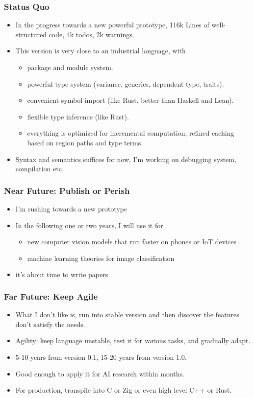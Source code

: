 \documentclass{beamer}   	%
\theoremstyle{definition}
\begin{document}
\begin{frame}
\frametitle{Status Quo}
\begin{itemize}
	\item In the progress towards a new powerful prototype, 116k Lines of well-structured code, 4k todos, 2k warnings.
	\item This version is very close to an industrial language, with
	\begin{itemize}
		\item package and module system.
		\item powerful type system (variance, generics, dependent type, traits).
		\item convenient symbol import (like Rust, better than Haskell and Lean).
		\item flexible type inference (like Rust).
		\item everything is optimized for incremental computation, refined caching based on region paths and type terms.
	\end{itemize}
	\item Syntax and semantics suffices for now, I'm working on debugging system, compilation etc.
\end{itemize}
\end{frame}

\begin{frame}
\frametitle{Near Future: Publish or Perish}
\begin{itemize}
	\item I'm rushing towards a new prototype
	\item In the following one or two years, I will use it for 
	\begin{itemize}
		\item new computer vision models that run faster on phones or IoT devices
		\item machine learning theories for image classification
	\end{itemize}
	\item it's about time to write papers
\end{itemize}
\end{frame}

\begin{frame}
\frametitle{Far Future: Keep Agile}
\begin{itemize}
	\item What I don't like is, run into stable version and then discover the features don't satisfy the needs.
	\item Agility: keep language unstable, test it for various tasks, and gradually adapt.
	\item 5-10 years from version 0.1, 15-20 years from version 1.0.
	\item Good enough to apply it for AI research within months.
	\item For production, transpile into C or Zig or even high level C++ or Rust.
\end{itemize}
\end{frame}
\end{document}
